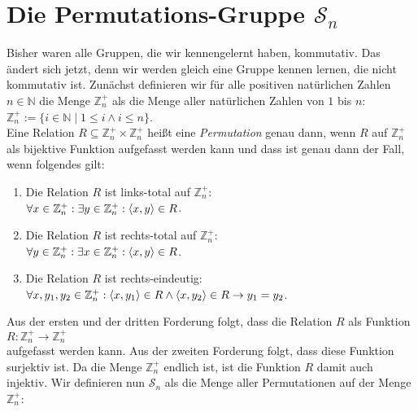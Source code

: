 \section{Die Permutations-Gruppe $\mathcal{S}_n$}
Bisher waren alle Gruppen, die wir kennengelernt haben, kommutativ.  Das ändert sich jetzt, denn wir
werden gleich eine Gruppe kennen lernen, die nicht kommutativ ist.  Zunächst definieren wir für alle
positiven natürlichen Zahlen $n \in \mathbb{N}$ die Menge $\mathbb{Z}_n^+$ als die Menge aller natürlichen Zahlen
von $1$ bis $n$:
\\[0.2cm]
\hspace*{1.3cm}
$\mathbb{Z}_n^+ := \{ i \in \mathbb{N} \mid 1 \leq i \wedge i \leq n \}$.
\\[0.2cm]
Eine Relation $R \subseteq \mathbb{Z}_n^+ \times \mathbb{Z}_n^+$ heißt eine \emph{Permutation} genau dann, wenn $R$ auf $\mathbb{Z}_n^+$
als bijektive Funktion aufgefasst werden kann und dass ist genau dann der Fall, wenn folgendes gilt:
\begin{enumerate}
\item Die Relation $R$ ist links-total auf $\mathbb{Z}_n^+$:
      \\[0.2cm]
      \hspace*{1.3cm}
      $\forall x \in \mathbb{Z}_n^+: \exists y \in \mathbb{Z}_n^+: \pair(x,y) \in R$.
\item Die Relation $R$ ist rechts-total auf $\mathbb{Z}_n^+$:
      \\[0.2cm]
      \hspace*{1.3cm}
      $\forall y \in \mathbb{Z}_n^+: \exists x \in \mathbb{Z}_n^+: \pair(x,y) \in R$.
\item Die Relation $R$ ist rechts-eindeutig:
      \\[0.2cm]
      \hspace*{1.3cm}
      $\forall x, y_1, y_2 \in \mathbb{Z}_n^+: \pair(x,y_1) \in R \wedge \pair(x,y_2) \in R \rightarrow y_1 = y_2$.
\end{enumerate}
Aus der ersten und der dritten Forderung folgt, dass die Relation $R$ als Funktion
\\[0.2cm]
\hspace*{1.3cm} $R : \mathbb{Z}_n^+ \rightarrow \mathbb{Z}_n^+$
\\[0.2cm]
aufgefasst werden kann.  Aus der zweiten Forderung folgt, dass diese Funktion surjektiv ist.  Da die
Menge $\mathbb{Z}_n^+$ endlich ist, ist die Funktion $R$ damit auch injektiv.
Wir definieren nun $\mathcal{S}_n$ als die Menge aller
Permutationen auf der Menge $\mathbb{Z}_n^+$:
